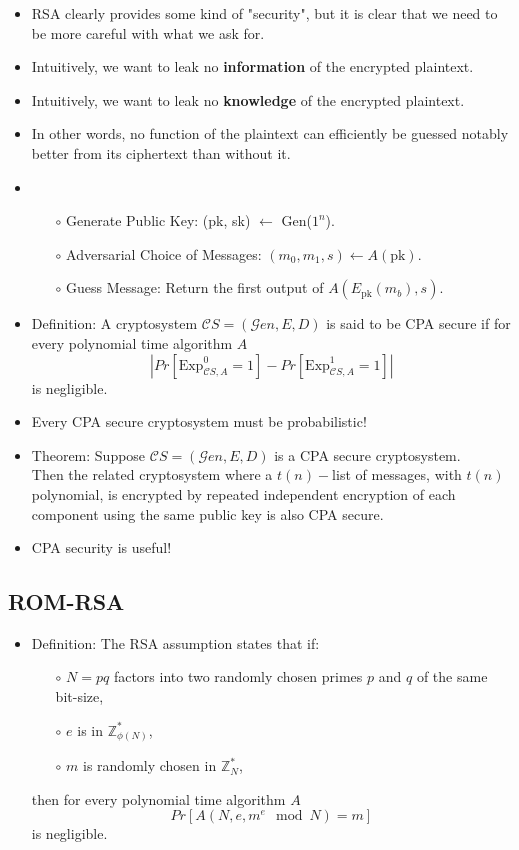 \documentclass[a4paper]{scrartcl}
\begin{document}
\begin{itemize}
\item RSA clearly provides some kind of "security", but it is clear that we need to be more careful with what we ask for.
\item Intuitively, we want to leak no \textbf{information} of the encrypted plaintext.
\item Intuitively, we want to leak no \textbf{knowledge} of the encrypted plaintext.
\item In other words, no function of the plaintext can efficiently be guessed notably better from its ciphertext than without it.
\item {}
\begin{itemize}
\item [$\circ$] Generate Public Key: (pk, sk) $\gets$ Gen($1^n$).
\item [$\circ$] Adversarial Choice of Messages: $(m_0, m_1, s) \gets A(\text{pk})$.
\item [$\circ$] Guess Message: Return the first output of $A(E_{\text{pk}}(m_b), s)$.
\end{itemize}
\item Definition: A cryptosystem ${\mathcal CS} = ({\mathcal Gen}, E, D)$ is said to be CPA secure if for every polynomial time algorithm $A$ $$|Pr[\text{Exp}^0_{{\mathcal CS},A} = 1] - Pr[\text{Exp}^1_{{\mathcal CS},A} = 1]|$$ is negligible.
\item Every CPA secure cryptosystem must be probabilistic!
\item Theorem: Suppose ${\mathcal CS} = ({\mathcal Gen}, E, D)$ is a CPA secure cryptosystem.\\ Then the related cryptosystem where a $t(n)-$list of messages, with $t(n)$ polynomial, is encrypted by repeated independent encryption of each component using the same public key is also CPA secure.
\item CPA security is useful!
\end{itemize}

\subsection*{ROM-RSA}

\begin{itemize}
\item Definition: The RSA assumption states that if:
\begin{itemize}
\item [$\circ$] $N = pq$ factors into two randomly chosen primes $p$ and $q$ of the same bit-size,
\item [$\circ$] $e$ is in $\mathbb{Z}_{\phi(N)}^*$,
\item [$\circ$] $m$ is randomly chosen in $\mathbb{Z}_N^*$,
\end{itemize}
then for every polynomial time algorithm $A$ $$Pr[A(N,e,m^e \mod N) = m]$$ is negligible. 
\end{itemize}
\end{document}
